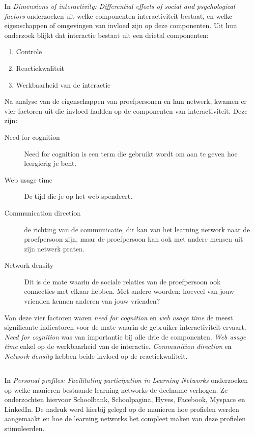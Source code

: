 \documentclass[a4paper, 10pt, pdftex]{report}
\begin{document}
      In \emph{Dimensions of interactivity: Differential effects of social and psychological factors} onderzoeken \citeauthor{Sohn2005} uit welke componenten interactiviteit bestaat, en welke eigenschappen of omgevingen van invloed zijn op deze componenten. Uit hun onderzoek blijkt dat interactie bestaat uit een drietal componenten:
        \begin{enumerate}
          \item Controle
          \item Reactiekwaliteit
          \item Werkbaarheid van de interactie
        \end{enumerate}
      Na analyse van de eigenschappen van proefpersonen en hun netwerk, kwamen er vier factoren uit die invloed hadden op de componenten van interactiviteit. Deze zijn:
        \begin{description}
          \item[Need for cognition]
            Need for cognition is een term die gebruikt wordt om aan te geven hoe leergierig je bent.
          \item[Web usage time]
            De tijd die je op het web spendeert.
          \item[Communication direction]
            de richting van de communicatie, dit kan van het learning network naar de proefpersoon zijn, maar de proefpersoon kan ook met andere mensen uit zijn netwerk praten.
          \item[Network density]
            Dit is de mate waarin de sociale relaties van de proefpersoon ook connecties met elkaar hebben. Met andere woorden: hoeveel van jouw vrienden kennen anderen van jouw vrienden?
        \end{description}
        Van deze vier factoren waren \emph{need for cognition} en \emph{web usage time} de meest significante indicatoren voor de mate waarin de gebruiker interactiviteit ervaart. \emph{Need for cognition} was van importantie bij alle drie de componenten. \emph{Web usage time} enkel op de werkbaarheid van de interactie. \emph{Communition direction} en \emph{Network density} hebben beide invloed op de reactiekwaliteit.

    \subsection{\cite{Brouns2008}}

    In \emph{Personal profiles: Facilitating participation in Learning Networks} onderzoeken \citeauthor{Brouns2008} op welke manieren bestaande learning networks de deelname verhogen. Ze onderzochten hiervoor Schoolbank, Schoolpagina, Hyves, Facebook, Myspace en LinkedIn. De nadruk werd hierbij gelegd op de manieren hoe profielen werden aangemaakt en hoe de learning networks het compleet maken van deze profielen stimuleerden.
\end{document}
